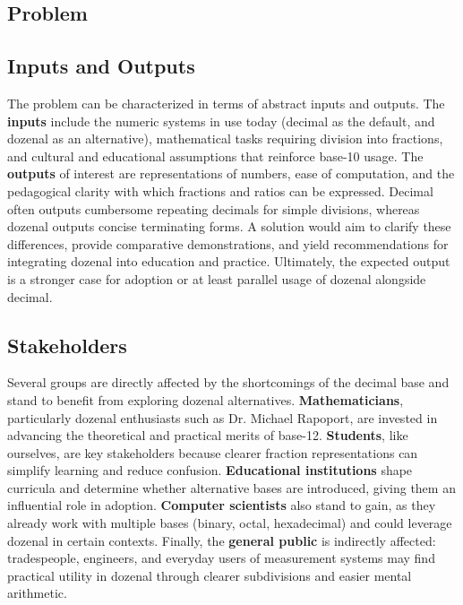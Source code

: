 \documentclass{article}
\begin{document}
    \subsection{Problem}
    
    \subsection{Inputs and Outputs}
    The problem can be characterized in terms of abstract inputs and outputs. The 
    \textbf{inputs} include the numeric systems in use today (decimal as the default, 
    and dozenal as an alternative), mathematical tasks requiring division into 
    fractions, and cultural and educational assumptions that reinforce base-10 usage. 
    The \textbf{outputs} of interest are representations of numbers, ease of computation, 
    and the pedagogical clarity with which fractions and ratios can be expressed. 
    Decimal often outputs cumbersome repeating decimals for simple divisions, whereas 
    dozenal outputs concise terminating forms. A solution would aim to clarify these 
    differences, provide comparative demonstrations, and yield recommendations for 
    integrating dozenal into education and practice. Ultimately, the expected output 
    is a stronger case for adoption or at least parallel usage of dozenal alongside decimal.

    \subsection{Stakeholders}
    Several groups are directly affected by the shortcomings of the decimal base and 
    stand to benefit from exploring dozenal alternatives. \textbf{Mathematicians}, 
    particularly dozenal enthusiasts such as Dr. Michael Rapoport, are invested in 
    advancing the theoretical and practical merits of base-12. \textbf{Students}, like 
    ourselves, are key stakeholders because clearer fraction representations can simplify 
    learning and reduce confusion. \textbf{Educational institutions} shape curricula 
    and determine whether alternative bases are introduced, giving them an influential 
    role in adoption. \textbf{Computer scientists} also stand to gain, as they already 
    work with multiple bases (binary, octal, hexadecimal) and could leverage dozenal in 
    certain contexts. Finally, the \textbf{general public} is indirectly affected: 
    tradespeople, engineers, and everyday users of measurement systems may find practical 
    utility in dozenal through clearer subdivisions and easier mental arithmetic.
\end{document}

